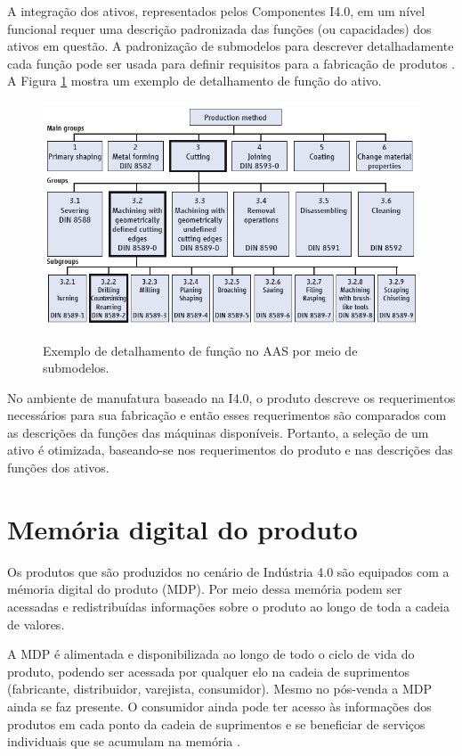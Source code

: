 \documentclass[
	12pt,				%
	oneside,			%
	a4paper,			%
	english,			%
	brazil				%
]{abntex2}
\begin{document}
	A integração dos ativos, representados pelos Componentes I4.0, em um nível funcional requer uma descrição padronizada das funções (ou capacidades) dos ativos em questão. A padronização de submodelos para descrever detalhadamente cada função pode ser usada para definir requisitos para a fabricação de produtos \cite{bedenbender2017aasexamples}. A Figura \ref{fig:submodelos} mostra um exemplo de detalhamento de função do ativo.
	
	\begin{figure}[H]
		\centering
		\caption{Exemplo de detalhamento de função no AAS por meio de submodelos.}
		\includegraphics[width=1\textwidth]{submodelos.png}
		\label{fig:submodelos}
	\end{figure}

	No ambiente de manufatura baseado na I4.0, o produto descreve os requerimentos necessários para sua fabricação e então esses requerimentos são comparados com as descrições da funções das máquinas disponíveis. Portanto, a seleção de um ativo é otimizada, baseando-se nos requerimentos do produto e nas descrições das funções dos ativos.
	

	\section{Memória digital do produto}

	Os produtos que são produzidos no cenário de Indústria 4.0 são equipados com a mémoria digital do produto (MDP). Por meio dessa memória podem ser acessadas e redistribuídas informações sobre o produto ao longo de toda a cadeia de valores.

	A MDP é alimentada e disponibilizada ao longo de todo o ciclo de vida do produto, podendo ser acessada por qualquer elo na cadeia de suprimentos (fabricante, distribuidor, varejista, consumidor). Mesmo no pós-venda a MDP ainda se faz presente. O consumidor ainda pode ter acesso às informações dos produtos em cada ponto da cadeia de suprimentos e se beneficiar de serviços individuais que se acumulam na memória \cite{brandherm2011productmemory}.
\end{document}
